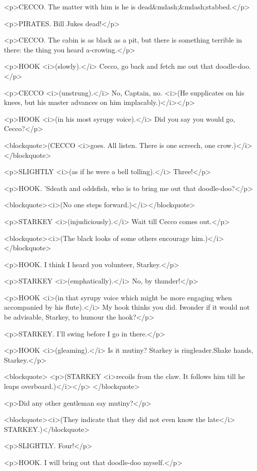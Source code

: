 <p>CECCO. The matter with him is he is dead&mdash;&mdash;stabbed.</p>

<p>PIRATES. Bill Jukes dead!</p>

<p>CECCO. The cabin is as black as a pit, but there is something
terrible in there: the thing you heard a-crowing.</p>

<p>HOOK <i>(slowly).</i> Cecco, go back and fetch me out that
doodle-doo.</p>

<p>CECCO <i>(unstrung).</i> No, Captain, no. <i>(He supplicates on
his knees, but his master advances on him implacably.)</i></p>

<p>HOOK <i>(in his most syrupy voice).</i> Did you say you would go,
Cecco?</p>

<blockquote>(CECCO <i>goes. All listen. There is one screech, one
crow.)</i></blockquote>

<p>SLIGHTLY <i>(as if he were a bell tolling).</i> Three!</p>

<p>HOOK. 'Sdeath and oddsfish, who is to bring me out that
doodle-doo?</p>

<blockquote><i>(No one steps forward.)</i></blockquote>

<p>STARKEY <i>(injudiciously).</i> Wait till Cecco comes out.</p>

<blockquote><i>(The black looks of some others encourage
him.)</i></blockquote>

<p>HOOK. I think I heard you volunteer, Starkey.</p>

<p>STARKEY <i>(emphatically).</i> No, by thunder!</p>

<p>HOOK <i>(in that syrupy voice which might be more engaging when
accompanied by his flute).</i> My hook thinks you did. Iwonder if it
would not be advisable, Starkey, to humour the hook?</p>

<p>STARKEY. I'll swing before I go in there.</p>

<p>HOOK <i>(gleaming).</i> Is it mutiny? Starkey is ringleader.Shake
hands, Starkey.</p>

<blockquote>
<p>(STARKEY <i>recoils from the claw. It follows him till he leaps
overboard.)</i></p>
</blockquote>

<p>Did any other gentleman say mutiny?</p>

<blockquote><i>(They indicate that they did not even know the
late</i> STARKEY.)</blockquote>

<p>SLIGHTLY. Four!</p>

<p>HOOK. I will bring out that doodle-doo myself.</p>

